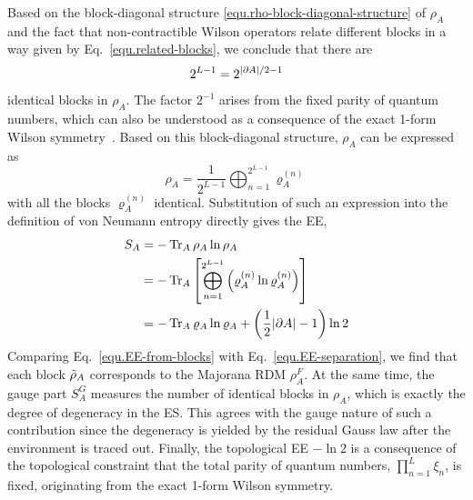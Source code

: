 Based on the block-diagonal structure \eqref{equ.rho-block-diagonal-structure} of $\rho_A$ and the fact that non-contractible Wilson operators relate different blocks in a way given by Eq.~\eqref{equ.related-blocks}, we conclude that there are 
\[2^{L-1} = 2^{\abs{\partial A}/2 - 1}\] 
identical blocks in $\rho_A$. The factor $2^{-1}$ arises from the fixed parity of quantum numbers, which can also be understood as a consequence of the exact 1-form Wilson symmetry~\cite{Xu-Rakovszky-Knap-Pollmann_2025}. Based on this block-diagonal structure, $\rho_A$ can be expressed as
\begin{equation}\label{equ.block-rho-final}
    \rho_A = \frac{1}{2^{L-1}}\bigoplus_{n=1}^{2^{L-1}}\varrho^{(n)}_A
\end{equation}
with all the blocks $\varrho_A^{(n)}$ identical. Substitution of such an expression into the definition of von Neumann entropy directly gives the EE, 
\begin{align}\label{equ.EE-from-blocks}
    S_A 
    &= -\Tr_A\rho_A\ln\rho_A \nonumber \\
    &= -\Tr_A\left[ \bigoplus_{n=1}^{2^{L-1}}\left( \varrho^{(n)}_A \ln \varrho^{(n)}_A \right) \right] \nonumber \\
    &= -\Tr_A \varrho_A\ln\varrho_A + \left( \frac{1}{2}\abs{\partial A} -  1 \right)\ln 2
\end{align}
Comparing Eq.~\eqref{equ.EE-from-blocks} with Eq.~\eqref{equ.EE-separation}, we find that each block $\Tilde{\rho}_A$ corresponds to the Majorana RDM $\rho_A^F$. At the same time, the gauge part $S^G_A$ measures the number of identical blocks in $\rho_A$, which is exactly the degree of degeneracy in the ES. This agrees with the gauge nature of such a contribution since the degeneracy 
is yielded by the residual Gauss law after the environment is traced out. Finally, the topological EE $-\ln 2$ is a consequence of the topological constraint that the total parity of quantum numbers, $\prod_{n=1}^L\xi_n$, is fixed, originating from the exact 1-form Wilson symmetry. 

